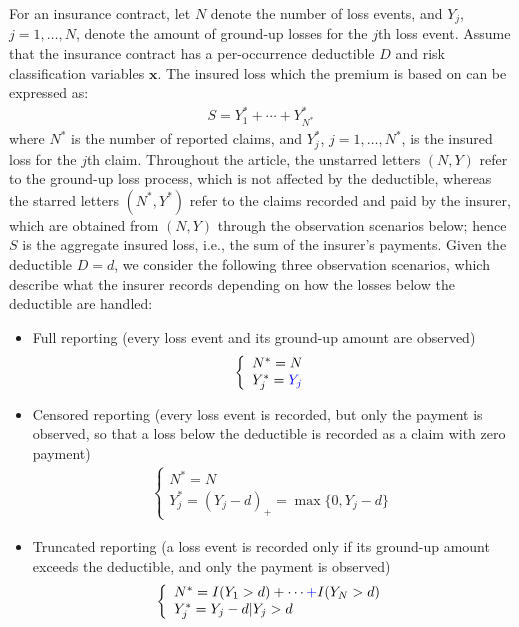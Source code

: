 \documentclass[11pt]{article}
\newcommand{\rev}[1]{{\color{blue}#1}}
\begin{document}
For an insurance contract, let $N$ denote the number of loss events, and $Y_{j}$, $j=1,\ldots,N$, denote the amount of ground-up losses for the $j$th loss event. 
Assume that the insurance contract has a per-occurrence deductible $D$ and risk classification variables $\bm{x}$. The insured loss which the premium is based on can be expressed as:
\begin{align*}
	S = Y^*_{1} + \cdots + Y^*_{N^*}
\end{align*}
where $N^*$ is the number of reported claims, and $Y^*_{j}$, $j=1,\ldots,N^*$, is the insured loss for the $j$th claim. \rev{Throughout the article, the unstarred letters $(N,Y)$ refer to the ground-up loss process, which is not affected by the deductible, whereas the starred letters $(N^*,Y^*)$ refer to the claims recorded and paid by the insurer, which are obtained from $(N,Y)$ through the observation scenarios below; hence $S$ is the aggregate insured loss, i.e., the sum of the insurer's payments.} Given the deductible $D=d$, we consider the \rev{following three observation scenarios, which describe what the insurer records depending on how the losses below the deductible are handled}:
\begin{itemize}
        \item \rev{Full reporting (every loss event and its ground-up amount are observed)}
        \begin{align*}
       	\left\{
       	\begin{array}{l}
       	N^* = N \\
		Y^*_{j}  = \rev{Y_{j}}
       	\end{array}
        \right.
       \end{align*}
	\item \rev{Censored reporting (every loss event is recorded, but only the payment is observed, so that a loss below the deductible is recorded as a claim with zero payment)}
       \begin{align*}
       	\left\{
       	\begin{array}{l}
       	N^* = N \\
		Y^*_{j}  = (Y_{j}-d)_{+} = \max\{0,Y_{j}-d\}
       	\end{array}
        \right.
       \end{align*}
	\item \rev{Truncated reporting (a loss event is recorded only if its ground-up amount exceeds the deductible, and only the payment is observed)}
	       \begin{align*}
	       		\left\{
	       		\begin{array}{l}
		N^* = I(Y_{1}>d) + \cdots \rev{+} I(Y_{N}>d) \\
		Y^*_{j}  = Y_{j}-d|Y_{j} >d
		\end{array}
		\right.
	\end{align*}
\end{itemize}
\end{document}
